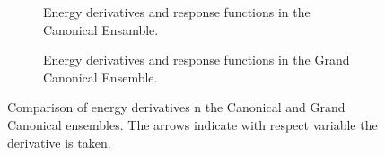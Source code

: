 \newpage
\vspace*{8em}%
\begin{figure}[h!]
  \centering
  \begin{subfigure}[t]{1\textwidth}
    \centering
    
    \caption{Energy derivatives and response functions in the Canonical Ensamble.}
    \label{fig_canonical}
  \end{subfigure}

  \vspace{4em}%

  \begin{subfigure}[t]{1\textwidth}
    \centering
    
    \caption{Energy derivatives and response functions in the Grand Canonical Ensemble.}
    \label{fig_grandcanonical}
  \end{subfigure}
  \caption{Comparison of energy derivatives n the
    Canonical and Grand Canonical ensembles. The arrows indicate with
    respect variable the derivative is taken.}
  \label{canetgrand}
\end{figure}
\vfill%

